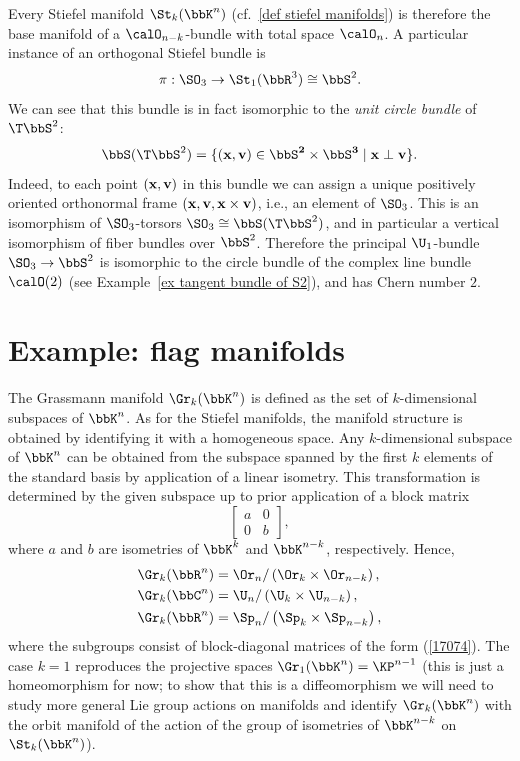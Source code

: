 \begin{example}\label{ex O2 Stiefel bundle}
    Every Stiefel manifold $\St_k(\bbK^n)$ (cf.\ \ref{def stiefel manifolds}) is therefore the base manifold of a $\calO_{n-k}$-bundle with total space $\calO_n$. A particular instance of an orthogonal Stiefel bundle is \[\pi:\SO_3\to \St_1(\bbR^3)\cong \bbS^2.\]
    We can see that this bundle is in fact isomorphic to the \emph{unit circle bundle} of $\T\bbS^2$:
    \[\bbS(\T\bbS^2)=\{(\bf{x},\bf{v})\in\bbS^2\times\bbS^3\mid \bf{x}\perp\bf{v}\}.\]
    Indeed, to each point $(\bf{x},\bf{v})$ in this bundle we can assign a unique positively oriented orthonormal frame $(\bf{x},\bf{v},\bf{x}\times\bf{v})$, i.e., an element of $\SO_3$. This is an isomorphism of $\SO_3$-torsors $\SO_3\cong \bbS(\T\bbS^2)$, and in particular a vertical isomorphism of fiber bundles over $\bbS^2$.  Therefore the principal $\U_1$-bundle $\SO_3\to \bbS^2$ is isomorphic to the circle bundle of the complex line bundle $\calO(2)$ (see Example~\ref{ex tangent bundle of S2}), and has Chern number $2$.
\end{example}





\section{Example: flag manifolds}\label{sec: flag manifolds}


\begin{defn}
    The Grassmann manifold $\Gr_k(\bbK^n)$ is defined as the set of $k$-dimensional subspaces of $\bbK^n$. As for the Stiefel manifolds, the manifold structure is obtained by identifying it with a homogeneous space. Any $k$-dimensional subspace of $\bbK^n$ can be obtained from the subspace spanned by the first $k$ elements of the standard basis by application of a linear isometry. This transformation is determined by the given subspace up to prior application of a block matrix
    \[\begin{bmatrix}
        a&0\\0&b
    \end{bmatrix},\label{17074}\]
    where $a$ and $b$ are isometries of $\bbK^k$ and $\bbK^{n-k}$, respectively. Hence,
    \begin{align}
        \Gr_k(\bbR^n)&=\Or_n\slash \left(\Or_k\times\Or_{n-k}\right),\\
        \Gr_k(\bbC^n)&=\U_n\slash \left(\U_k\times\U_{n-k}\right),\\
        \Gr_k(\bbR^n)&=\Sp_n\slash \left(\Sp_k\times\Sp_{n-k}\right),
    \end{align}
    where the subgroups consist of block-diagonal matrices of the form (\ref{17074}). The case $k=1$ reproduces the projective spaces $\Gr_1(\bbK^n)=\KP^{n-1}$ (this is just a homeomorphism for now; to show that this is a diffeomorphism we will need to study more general Lie group actions on manifolds and identify $\Gr_k(\bbK^n)$ with the orbit manifold of the action of the group of isometries of $\bbK^{n-k}$ on $\St_k(\bbK^n)$).
\end{defn}


